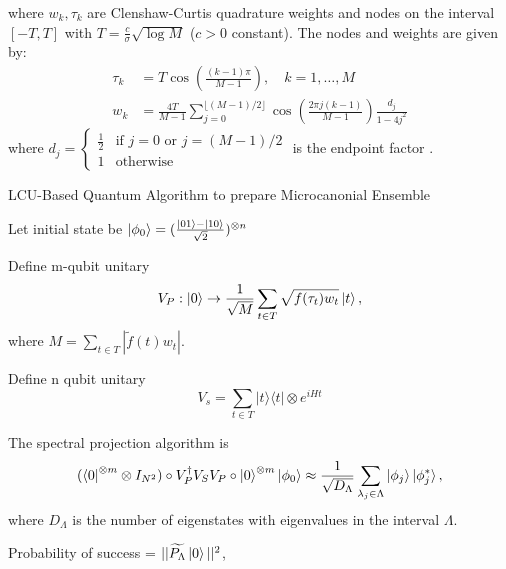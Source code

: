 \documentclass[10pt]{amsart}
\newcommand{\dmat}[1]{{| #1 \rangle \langle #1 |}}
\begin{document}
where $w_k, \tau_k$ are Clenshaw-Curtis quadrature weights and nodes on the interval $[-T, T]$ with $T = \frac{c}{\sigma}\sqrt{\log M}$ ($c > 0$ constant). The nodes and weights are given by:
\begin{align*}
\tau_k &= T \cos\left(\frac{(k-1)\pi}{M-1}\right), \quad k=1,\dots,M \\
w_k &= \frac{4T}{M-1} \sum_{j=0}^{\lfloor (M-1)/2 \rfloor} \cos\left( \frac{2\pi j (k-1)}{M-1} \right)\frac{d_j}{1-4j^2} 
\end{align*}
where $d_j = \begin{cases} 
\frac{1}{2} & \text{if } j=0 \text{ or } j=(M-1)/2 \\
1 & \text{otherwise}
\end{cases}$ is the endpoint factor \cite{T08}. 

LCU-Based Quantum Algorithm to prepare Microcanonial Ensemble

Let initial state be $\ket{\phi_0} = (\frac{\ket{01}-\ket{10}}{\sqrt{2}})^{\otimes n}$

Define m-qubit unitary 
$$V_P : \ket{0} \rightarrow \frac{1}{\sqrt{M}} \sum_{t\in T} \sqrt{f(\tau_t)w_t} \ket{t},$$ where $M= \sum_{t \in T}|\widetilde{f}(t)w_t|$.

Define n qubit unitary $$V_s = \sum_{t\in T} \dmat{t}\otimes e^{iHt}$$

The spectral projection algorithm is 
$$(\bra{0}^{\otimes m} \otimes I_{N^2}) \circ V_P^{\dagger}V_S V_P \circ \ket{0}^{\otimes m}\ket{\phi_0} \approx \frac{1}{\sqrt{D_{\Lambda}}}\sum_{\lambda_j \in \Lambda} \ket{\phi_j}\ket{\phi_j^*},$$
where $D_{\Lambda}$ is the number of eigenstates with eigenvalues in the interval $\Lambda$.

Probability of success = $||\widetilde{P_{\Lambda}}\ket{0}||^2$,
\end{document}
